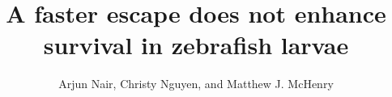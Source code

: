 \documentclass[]{rsos}%
\begin{document}
\title{A faster escape does not enhance survival in zebrafish larvae}


\author{%
Arjun Nair, Christy Nguyen, and Matthew J. McHenry}

\address{Department of Ecology and Evolutionary Biology\\
University of California, Irvine\\
321 Steinhaus Hall\\
Irvine, CA 92697}

\subject{Animal behavior, biomechanics}






\maketitle




\linespread{1.3}\selectfont %
\end{document}
